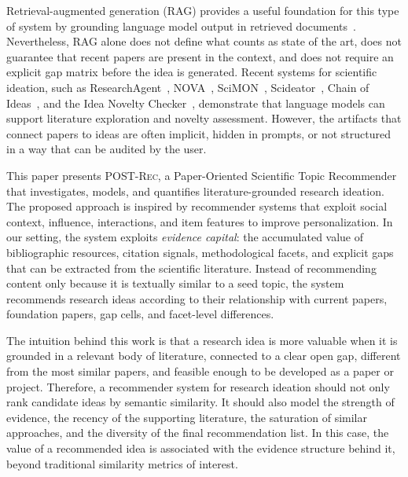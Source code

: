 \documentclass[preprint,12pt]{elsarticle}
\begin{document}
Retrieval-augmented generation (RAG) provides a useful foundation for this type of system by grounding language model output in retrieved documents~\cite{lewis2020rag}. Nevertheless, RAG alone does not define what counts as state of the art, does not guarantee that recent papers are present in the context, and does not require an explicit gap matrix before the idea is generated. Recent systems for scientific ideation, such as ResearchAgent~\cite{baek2025researchagent}, NOVA~\cite{hu2025nova}, SciMON~\cite{wang2024scimon}, Scideator~\cite{roy2024scideator}, Chain of Ideas~\cite{li2025coi}, and the Idea Novelty Checker~\cite{ramesh2025inc}, demonstrate that language models can support literature exploration and novelty assessment. However, the artifacts that connect papers to ideas are often implicit, hidden in prompts, or not structured in a way that can be audited by the user.

This paper presents \textsc{POST-Rec}, a Paper-Oriented Scientific Topic Recommender that investigates, models, and quantifies literature-grounded research ideation. The proposed approach is inspired by recommender systems that exploit social context, influence, interactions, and item features to improve personalization. In our setting, the system exploits \emph{evidence capital}: the accumulated value of bibliographic resources, citation signals, methodological facets, and explicit gaps that can be extracted from the scientific literature. Instead of recommending content only because it is textually similar to a seed topic, the system recommends research ideas according to their relationship with current papers, foundation papers, gap cells, and facet-level differences.

The intuition behind this work is that a research idea is more valuable when it is grounded in a relevant body of literature, connected to a clear open gap, different from the most similar papers, and feasible enough to be developed as a paper or project. Therefore, a recommender system for research ideation should not only rank candidate ideas by semantic similarity. It should also model the strength of evidence, the recency of the supporting literature, the saturation of similar approaches, and the diversity of the final recommendation list. In this case, the value of a recommended idea is associated with the evidence structure behind it, beyond traditional similarity metrics of interest.
\end{document}
